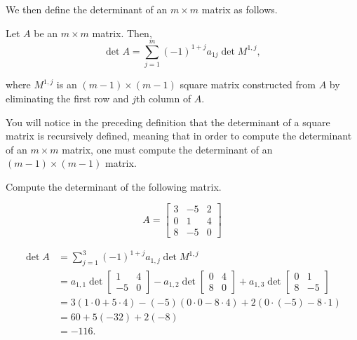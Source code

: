 We then define the determinant of an $m\times m$ matrix as follows. 

{Let $A$ be an $m\times m$ matrix.  Then, 
\[\det A = \sum_{j=1}^m (-1)^{1+j} a_{1j}\det M^{1,j},\]

\noindent where $M^{1,j}$ is an $(m-1)\times (m-1)$ square matrix constructed from $A$ by eliminating the first row and $j$th column of $A$.
}


You will notice in the preceding definition that the determinant of a square matrix is recursively defined, meaning that in order to compute the determinant of an $m\times m$ matrix, one must compute the determinant of an $(m-1)\times (m-1)$ matrix.\\

{Compute the determinant of the following matrix.

\[A = 
\begin{bmatrix}
3 &-5 & 2\\
0 & 1 & 4\\
8 & -5 & 0
\end{bmatrix}
\]
}
{
\begin{align*}
	\det A &= \sum_{j=1}^3 (-1)^{1+j}a_{1,j} \det M^{1,j} \\
				&= a_{1,1}
				\det \begin{bmatrix}
					1 & 4\\
					-5 & 0
				\end{bmatrix}
				- a_{1,2}
				\det \begin{bmatrix}
					0 & 4\\
					8 & 0 
					\end{bmatrix}
				+ a_{1,3}
				\det \begin{bmatrix}
					0 & 1\\
					8 & -5
				\end{bmatrix}\\
				&= 3(1\cdot 0 + 5\cdot 4)- (-5)(0\cdot 0 - 8\cdot 4)+ 2(0\cdot (-5)-8\cdot 1)\\
				& = 60+5(-32)+2(-8)\\
				& = -116.
\end{align*}
}\\


